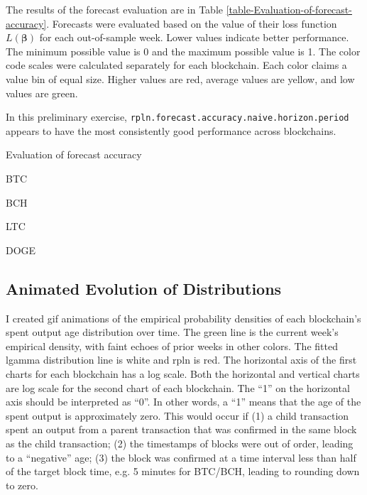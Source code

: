 \documentclass[english]{article}
\begin{document}
The results of the forecast evaluation are in Table \ref{table-Evaluation-of-forecast-accuracy}.
Forecasts were evaluated based on the value of their loss function
$L(\boldsymbol{\beta})$ for each out-of-sample week. Lower values
indicate better performance. The minimum possible value is 0 and the
maximum possible value is 1. The color code scales were calculated
separately for each blockchain. Each color claims a value bin of equal
size. Higher values are red, average values are yellow, and low values
are green.

In this preliminary exercise, \texttt{rpln.forecast.accuracy.naive.horizon.period}
appears to have the most consistently good performance across blockchains.

\begin{table}
\caption{Evaluation of forecast accuracy}

\label{table-Evaluation-of-forecast-accuracy}

\tiny

BTC



BCH



LTC



DOGE


\end{table}


\subsection{Animated Evolution of Distributions}

I created gif animations of the empirical probability densities of
each blockchain's spent output age distribution over time. The green
line is the current week's empirical density, with faint echoes of
prior weeks in other colors. The fitted lgamma distribution line is
white and rpln is red. The horizontal axis of the first charts for
each blockchain has a log scale. Both the horizontal and vertical
charts are log scale for the second chart of each blockchain. The
``1'' on the horizontal axis should be interpreted as ``0''. In
other words, a ``1'' means that the age of the spent output is approximately
zero. This would occur if (1) a child transaction spent an output
from a parent transaction that was confirmed in the same block as
the child transaction; (2) the timestamps of blocks were out of order,
leading to a ``negative'' age; (3) the block was confirmed at a
time interval less than half of the target block time, e.g. 5 minutes
for BTC/BCH, leading to rounding down to zero.
\end{document}
